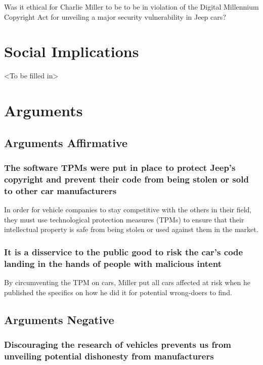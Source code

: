 \documentclass[12pt]{article}
\begin{document}
\begin{multicols}{2}
Was it ethical for Charlie Miller to be to be in violation of the Digital Millennium Copyright Act for unveiling a major security vulnerability in Jeep cars?

\section{Social Implications} 
<To be filled in>

\section{Arguments}

\subsection{Arguments Affirmative}
\subsubsection{The software TPMs were put in place to protect Jeep's copyright and prevent their code from being stolen or sold to other car manufacturers}

In order for vehicle companies to stay competitive with the others in their field, they must use technological protection measures (TPMs) to ensure that their intellectual property is safe from being stolen or used against them in the market. 
     
\subsubsection{It is a disservice to the public good to risk the car's code landing in the hands of people with malicious intent}

By circumventing the TPM on cars, Miller put all cars affected at risk when he published the specifics on how he did it\cite{officialPaper} for potential wrong-doers to find. 

\subsection{Arguments Negative}

\subsubsection{Discouraging the research of vehicles prevents us from unveiling potential dishonesty from manufacturers}


\end{multicols}
\end{document}
